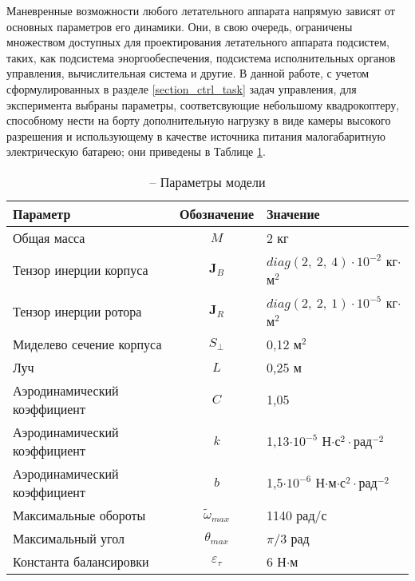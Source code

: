 Маневренные возможности любого летательного аппарата напрямую зависят от основных параметров его динамики.
Они, в свою очередь, ограничены множеством доступных для проектирования летательного аппарата подсистем, таких, как подсистема эноргообеспечения, подсистема исполнительных органов управления, вычислительная система и другие. 
В данной работе, с учетом сформулированных в разделе \ref{section_ctrl_task} задач управления, для эксперимента выбраны параметры, соответсвующие небольшому квадрокоптеру, способному нести на борту дополнительную нагрузку в виде камеры высокого разрешения и использующему в качестве источника питания малогабаритную электрическую батарею; они приведены в Таблице \ref{tb:params_table}.
\begin{table}[h!]
	\centering
	\caption{ -- Параметры модели}\label{tb:params_table} 
	\begin{tabular}{lcl}
		\hline
		Параметр & Обозначение & Значение  \\\hline
		Общая масса & $M$ & 2 кг  \\
		Тензор инерции корпуса & $\bm J_B$ & $diag(2,\ 2,\ 4)\cdot{10^{-2}}$ кг$\cdot$м$^2$  \\
		Тензор инерции ротора & $\bm J_R$ & $diag(2,\ 2,\ 1)\cdot{10^{-5}}$ кг$\cdot$м$^2$  \\
		Миделево сечение корпуса & $S_{\perp}$ & 0,12 м$^2$ \\
		Луч & $L$ & 0,25 м \\
		Аэродинамический коэффициент & $C$ & 1,05\\
		Аэродинамический коэффициент & $k$ & 1,13$\cdot 10^{-5}$ Н$\cdot$с$^2\cdot$рад$^{-2}$ \\		
		Аэродинамический коэффициент & $b$ & 1,5$\cdot 10^{-6}$ Н$\cdot$м$\cdot$с$^2\cdot$рад$^{-2}$ \\		
		Максимальные обороты & $\tilde \omega_{max}$ & 1140 рад/с \\		
		Максимальный угол & $\theta_{max}$ & ${\pi}/{3}$ рад \\
		Константа балансировки & $\varepsilon_\tau$ &6 Н$\cdot$м \\
		\hline
	\end{tabular}
\end{table}

